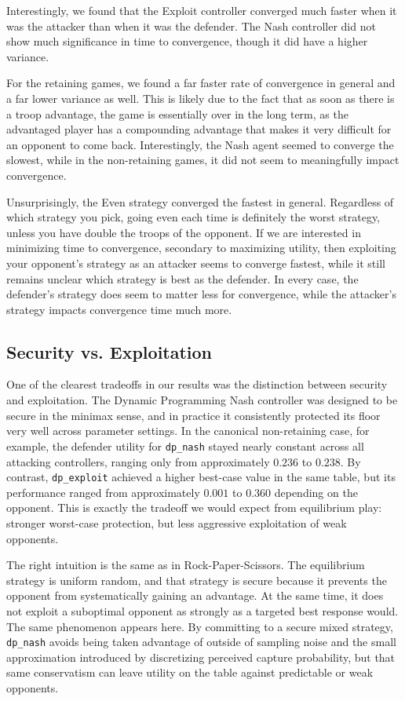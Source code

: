 \documentclass[letterpaper, 10 pt, conference]{ieeeconf}  %
\begin{document}
Interestingly, we found that the Exploit controller converged much faster when it was the attacker than when it was the defender. The Nash controller did not show much significance in time to convergence, though it did have a higher variance.

For the retaining games, we found a far faster rate of convergence in general and a far lower variance as well. This is likely due to the fact that as soon as there is a troop advantage, the game is essentially over in the long term, as the advantaged player has a compounding advantage that makes it very difficult for an opponent to come back. Interestingly, the Nash agent seemed to converge the slowest, while in the non-retaining games, it did not seem to meaningfully impact convergence.

Unsurprisingly, the Even strategy converged the fastest in general. Regardless of which strategy you pick, going even each time is definitely the worst strategy, unless you have double the troops of the opponent. If we are interested in minimizing time to convergence, secondary to maximizing utility, then exploiting your opponent's strategy as an attacker seems to converge fastest, while it still remains unclear which strategy is best as the defender. In every case, the defender's strategy does seem to matter less for convergence, while the attacker's strategy impacts convergence time much more.

\subsection{Security vs. Exploitation}
One of the clearest tradeoffs in our results was the distinction between security and exploitation. The Dynamic Programming Nash controller was designed to be secure in the minimax sense, and in practice it consistently protected its floor very well across parameter settings. In the canonical non-retaining case, for example, the defender utility for \texttt{dp\_nash} stayed nearly constant across all attacking controllers, ranging only from approximately $0.236$ to $0.238$. By contrast, \texttt{dp\_exploit} achieved a higher best-case value in the same table, but its performance ranged from approximately $0.001$ to $0.360$ depending on the opponent. This is exactly the tradeoff we would expect from equilibrium play: stronger worst-case protection, but less aggressive exploitation of weak opponents.

The right intuition is the same as in Rock-Paper-Scissors. The equilibrium strategy is uniform random, and that strategy is secure because it prevents the opponent from systematically gaining an advantage. At the same time, it does not exploit a suboptimal opponent as strongly as a targeted best response would. The same phenomenon appears here. By committing to a secure mixed strategy, \texttt{dp\_nash} avoids being taken advantage of outside of sampling noise and the small approximation introduced by discretizing perceived capture probability, but that same conservatism can leave utility on the table against predictable or weak opponents.
\end{document}
